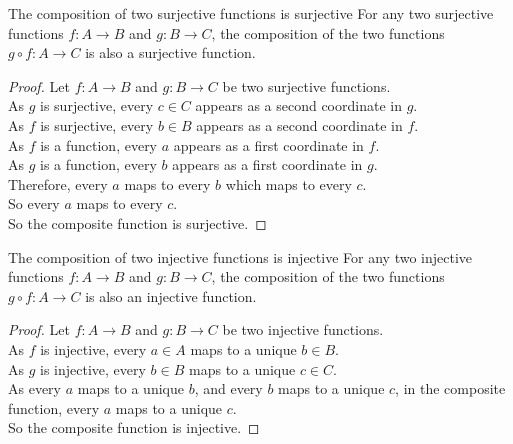 \documentclass[\main/notes.tex]{subfiles}
\begin{document}
			\begin{theorem}{The composition of two surjective functions is surjective}
				For any two surjective functions $f: A \rightarrow B$ and $g: B \rightarrow C$, the composition of the two functions\\
					$g \circ f: A \rightarrow C$ is also a surjective function.
					\begin{proof}
						Let $f: A \rightarrow B$ and $g: B \rightarrow C$ be two surjective functions.\\
						As $g$ is surjective, every $c \in C$ appears as a second coordinate in $g$.\\
						As $f$ is surjective, every $b \in B$ appears as a second coordinate in $f$.\\
						As $f$ is a function, every $a$ appears as a first coordinate in $f$.\\
						As $g$ is a function, every $b$ appears as a first coordinate in $g$.\\
						Therefore, every $a$ maps to every $b$ which maps to every $c$.\\
						So every $a$ maps to every $c$.\\
						So the composite function is surjective.
					\end{proof}
			\end{theorem}
			\begin{theorem}{The composition of two injective functions is injective}
				For any two injective functions $f: A \rightarrow B$ and $g: B \rightarrow C$, the composition of the two functions\\
					$g \circ f: A \rightarrow C$ is also an injective function.
					\begin{proof}
						Let $f: A \rightarrow B$ and $g: B \rightarrow C$ be two injective functions.\\
						As $f$ is injective, every $a \in A$ maps to a unique $b \in B$.\\
						As $g$ is injective, every $b \in B$ maps to a unique $c \in C$.\\
						As every $a$ maps to a unique $b$, and every $b$ maps to a unique $c$, in the composite function, every $a$ maps to a unique $c$.\\
						So the composite function is injective.
					\end{proof}
			\end{theorem}
\end{document}
